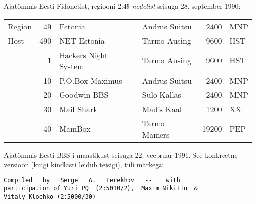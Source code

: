 
Ajatõmmis Eesti Fidonetist, regiooni 2:49 \emph{nodelist} seisuga 28. september 1990:

\begin{table}
\label{sisu:nodelist}
\centering
\begin{tabular}{lrllrl}
Region & 49  & Estonia              & Andrus Suitsu\index[ppl]{Suitsu, Andrus} & 2400  & MNP  \\
Host   & 490 & NET Estonia           & Tarmo Ausing\index[ppl]{Ausing, Tarmo}  & 9600  & HST  \\
       & 1   & Hackers Night System  & Tarmo Ausing  & 9600  & HST  \\
       & 10  & P.O.Box Maximus       & Andrus Suitsu & 2400  & MNP  \\
       & 20  & Goodwin BBS           & Sulo Kallas\index[ppl]{Kallas, Sulo}   & 2400  & MNP  \\
       & 30  & Mail Shark            & Madis Kaal\index[ppl]{Kaal, Madis}    & 1200  & XX   \\
       & 40  & MamBox                & Tarmo Mamers\index[ppl]{Mamers, Tarmo}  & 19200 & PEP 
\end{tabular}
\end{table}

Ajatõmmis Eesti BBS-i maastikust seisuga 22. veebruar 1991. See konkreetne versioon (kuigi kindlasti leidub teisigi), tuli märkega:

\begin{verbatim}
Compiled   by   Serge   A.   Terekhov   --    with
participation of Yuri PQ  (2:5010/2),  Maxim Nikitin  &
Vitaly Klochko (2:5000/30)
\end{verbatim}

